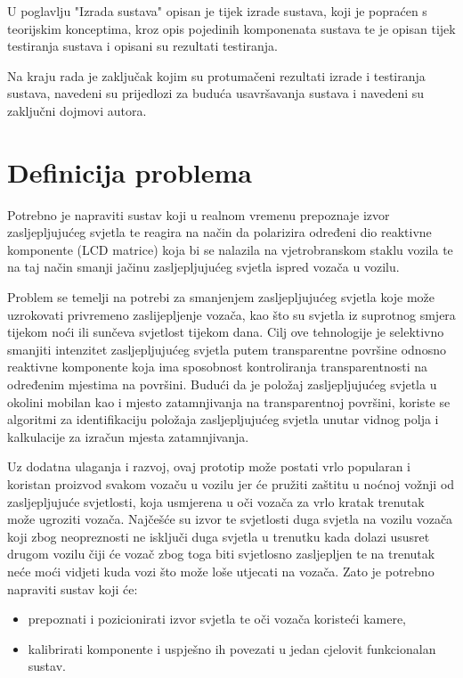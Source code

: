 \documentclass{foi}
\begin{document}
U poglavlju "Izrada sustava" opisan je tijek izrade sustava, koji je popraćen s teorijskim konceptima, kroz opis pojedinih komponenata sustava te je opisan tijek testiranja sustava i opisani su rezultati testiranja.

Na kraju rada je zaključak kojim su protumačeni rezultati izrade i testiranja sustava, navedeni su prijedlozi za buduća usavršavanja sustava i navedeni su zaključni dojmovi autora.

\section{Definicija problema}

 Potrebno je napraviti sustav koji u realnom vremenu prepoznaje izvor zasljepljujućeg svjetla te reagira na način da polarizira određeni dio reaktivne komponente (LCD matrice) koja bi se nalazila na vjetrobranskom staklu vozila te na taj način smanji jačinu zasljepljujućeg svjetla ispred vozača u vozilu.

 Problem se temelji na potrebi za smanjenjem zasljepljujućeg svjetla koje može uzrokovati privremeno zaslijepljenje vozača, kao što su svjetla iz suprotnog smjera tijekom noći ili sunčeva svjetlost tijekom dana. Cilj ove tehnologije je selektivno smanjiti intenzitet zasljepljujućeg svjetla putem transparentne površine odnosno reaktivne komponente koja ima sposobnost kontroliranja transparentnosti na određenim mjestima na površini. Budući da je položaj zasljepljujućeg svjetla u okolini mobilan kao i mjesto zatamnjivanja na transparentnoj površini, koriste se algoritmi za identifikaciju položaja zasljepljujućeg svjetla unutar vidnog polja i kalkulacije za izračun mjesta zatamnjivanja.

Uz dodatna ulaganja i razvoj, ovaj prototip može postati vrlo popularan i koristan proizvod svakom vozaču u vozilu jer će pružiti zaštitu u noćnoj vožnji od zasljepljujuće svjetlosti, koja usmjerena u oči vozača za vrlo kratak trenutak može ugroziti vozača. Najčešće su izvor te svjetlosti duga svjetla na vozilu vozača koji zbog neopreznosti ne isključi duga svjetla u trenutku kada dolazi ususret drugom vozilu čiji će vozač zbog toga biti svjetlosno zasljepljen te na trenutak neće moći vidjeti kuda vozi što može loše utjecati na vozača. Zato je potrebno napraviti sustav koji će:
\begin{itemize}[noitemsep]
    \item prepoznati i pozicionirati izvor svjetla te oči vozača koristeći kamere,
    \item kalibrirati komponente i uspješno ih povezati u jedan cjelovit funkcionalan sustav.
\end{itemize}
\end{document}
